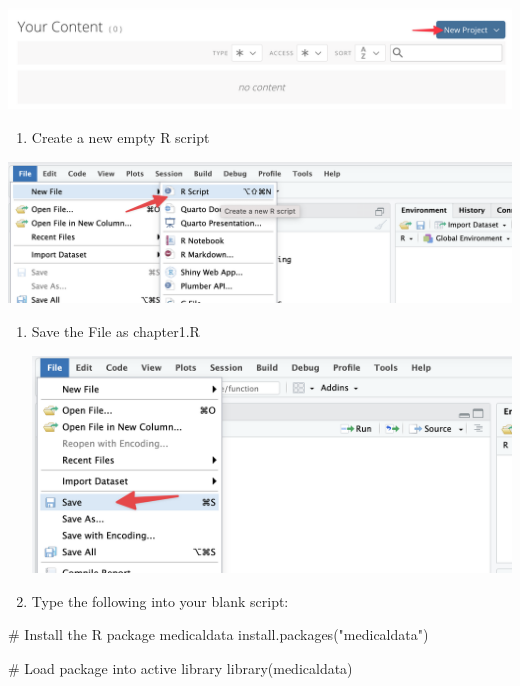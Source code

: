 \documentclass[
  letterpaper,
  DIV=11,
  numbers=noendperiod]{scrreprt}
\newenvironment{Shaded}{\begin{snugshade}}{\end{snugshade}}
\newcommand{\CommentTok}[1]{\textcolor[rgb]{0.37,0.37,0.37}{#1}}
\newcommand{\FunctionTok}[1]{\textcolor[rgb]{0.28,0.35,0.67}{#1}}
\newcommand{\NormalTok}[1]{\textcolor[rgb]{0.00,0.23,0.31}{#1}}
\newcommand{\StringTok}[1]{\textcolor[rgb]{0.13,0.47,0.30}{#1}}
\providecommand{\tightlist}{%
  \setlength{\itemsep}{0pt}\setlength{\parskip}{0pt}}\usepackage{longtable,booktabs,array}
\begin{document}
\includegraphics{./images/posit.cloud_login_code=RjaPWEO8K1VLgeNKrf5fPzXTp4ezfa (1)-01.png}

\begin{enumerate}
\def\labelenumi{\arabic{enumi}.}
\setcounter{enumi}{1}
\tightlist
\item
  Create a new empty R script
\end{enumerate}

\includegraphics{./images/CleanShot 2023-06-12 at 22.18.53@2x.png}

\begin{enumerate}
\def\labelenumi{\arabic{enumi}.}
\setcounter{enumi}{2}
\item
  Save the File as chapter1.R

  \includegraphics{./images/CleanShot 2023-06-12 at 22.21.34@2x.png}
\item
  Type the following into your blank script:
\end{enumerate}

\begin{Shaded}
\begin{Highlighting}[]
\CommentTok{\# Install the R package medicaldata}
\FunctionTok{install.packages}\NormalTok{(}\StringTok{"medicaldata"}\NormalTok{)}

\CommentTok{\# Load package into active library}
\FunctionTok{library}\NormalTok{(medicaldata)}
\end{Highlighting}
\end{Shaded}
\end{document}
